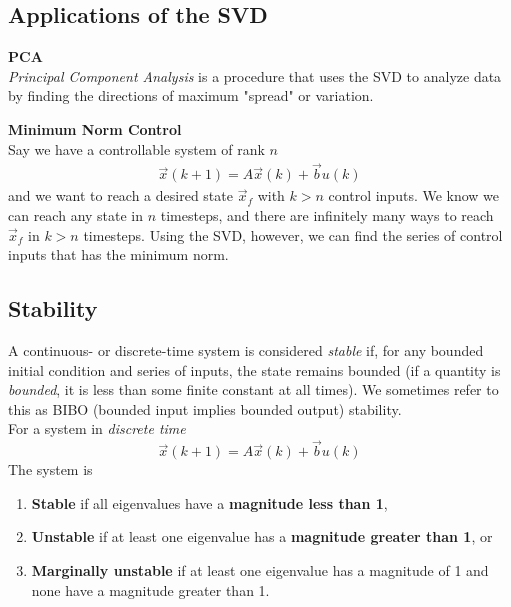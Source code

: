 \renewcommand{\arraystretch}{1.25}

\subsection*{Applications of the SVD}
\textbf{PCA} \\
\newline
\textit{Principal Component Analysis} is a procedure that uses the SVD to analyze data by finding the directions of maximum "spread" or variation. \\
\newline

\textbf{Minimum Norm Control} \\
\newline
Say we have a controllable system of rank $n$
\begin{align*}
    \vec{x}(k + 1) = A\vec{x}(k) + \vec{b}u(k)
\end{align*}
 and we want to reach a desired state $\vec{x}_f$ with $k > n$ control inputs. We know we can reach any state in $n$ timesteps, and there are infinitely many ways to reach $\vec{x}_f$ in $k > n$ timesteps. Using the SVD, however, we can find the series of control inputs that has the minimum norm.

\subsection*{Stability}
A continuous- or discrete-time system is considered \textit{stable} if, for any bounded initial condition and series of inputs, the state remains bounded (if a quantity is \textit{bounded}, it is less than some finite constant at all times). We sometimes refer to this as BIBO (bounded input implies bounded output) stability. \\
\newline
For a system in \textit{discrete time}
$$\vec{x}(k + 1) = A\vec{x}(k) + \vec{b}u(k)$$
The system is
\begin{enumerate}
    \item \textbf{Stable} if all eigenvalues have a \textbf{magnitude less than 1},
    \item \textbf{Unstable} if at least one eigenvalue has a \textbf{magnitude greater than 1}, or
    \item \textbf{Marginally unstable} if at least one eigenvalue has a magnitude of 1 and none have a magnitude greater than 1.
\end{enumerate}


